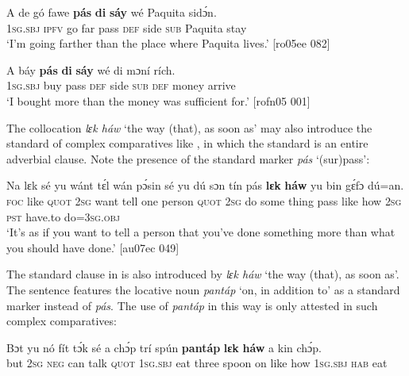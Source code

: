 \ea%
    \label{ex:key:479}
    \gll A    de  gó  fawe  \textbf{pás}  \textbf{di}  \textbf{sáy}  wé  Paquita  sidɔ́n.\\
\textsc{1sg.sbj}  \textsc{ipfv}  go  far    pass  \textsc{def}  side  \textsc{sub}  Paquita  stay\\

\glt ‘I’m going farther than the place where Paquita lives.’ [ro05ee 082]
\z


\ea%
    \label{ex:key:480}
    \gll A    báy  \textbf{pás}  \textbf{di}  \textbf{sáy}  wé  di  mɔní  rích.\\
\textsc{1sg.sbj}  buy  pass  \textsc{def}  side  \textsc{sub}  \textsc{def}  money  arrive\\

\glt ‘I bought more than the money was sufficient for.’ [rofn05 001]
\z

The collocation \textit{lɛk háw} ‘the way (that), as soon as’ may also introduce the standard of complex comparatives like , in which the standard is an entire adverbial clause. Note the presence of the standard marker \textit{pás} ‘(sur)pass’: 


\ea%
    \label{ex:key:481}
    \gll Na  lɛk  sé  yu  wánt  tɛ́l  wán  pɔ́sin  sé  yu  dú  sɔn
tín    pás    \textbf{lɛk}  \textbf{háw}    yu  bin  gɛ́fɔ    dú=an.\\
\textsc{foc}  like  \textsc{quot}  \textsc{2sg}  want  tell  one  person  \textsc{quot}  \textsc{2sg}  do  some
thing  pass    like  how    \textsc{2sg}  \textsc{pst}  have.to  do=\textsc{3sg.obj}\\

\glt ‘It’s as if you want to tell a person that you’ve done something more 
than what you should have done.’ [au07ec 049]
\z

The standard clause in  is also introduced by \textit{lɛk háw} ‘the way (that), as soon as’. The sentence features the locative noun \textit{pantáp} ‘on, in addition to’ as a standard marker instead of \textit{pás}. The use of \textit{pantáp} in this way is only attested in such complex comparatives: 


\ea%
    \label{ex:key:482}
    \gll Bɔt  yu  nó  fít  tɔ́k  sé    a    chɔ́p  trí    spún
\textbf{pantáp}  \textbf{lɛk}  \textbf{háw}   a    kin  chɔ́p.\\
but  \textsc{2sg}  \textsc{neg}  can  talk  \textsc{quot}    \textsc{1sg.sbj}  eat    three  spoon
on    like  how    \textsc{1sg.sbj}  \textsc{hab}  eat\\

